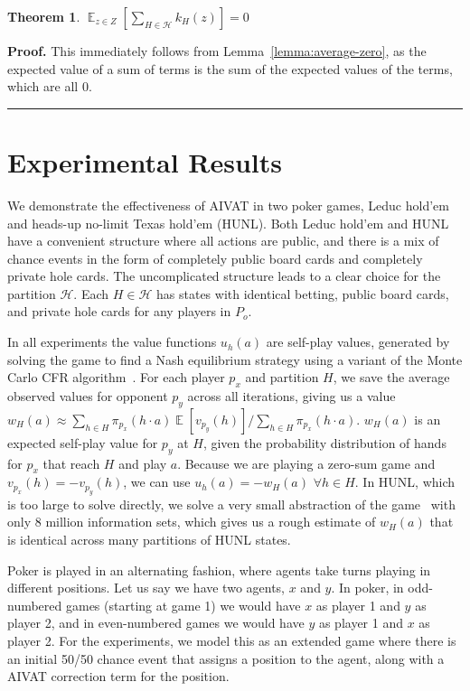 \documentclass[letterpaper]{article}
\newtheorem{theorem}{Theorem}
\newenvironment{proof}[1][Proof]{\textbf{#1.} }{\ \rule{0.5em}{0.5em}}
\def\VAT{AIVAT}
\def\leduc{Leduc hold'em}
\def\texas{Texas hold'em}
\begin{document}
\begin{theorem}
$\mathop{\mathbb{E}}_{z \in Z} [\sum_{H \in \mathcal{H}} k_H(z) ] = 0$
\end{theorem}
\begin{proof}
This immediately follows from Lemma~\ref{lemma:average-zero}, as the
expected value of a sum of terms is the sum of the expected values of
the terms, which are all $0$.
\end{proof}


\section{Experimental Results}
We demonstrate the effectiveness of \VAT{} in two poker games,
\leduc{} and heads-up no-limit \texas{} (HUNL). Both \leduc{} and
HUNL have a convenient structure where all actions are public, and
there is a mix of chance events in the form of completely public board
cards and completely private hole cards. The uncomplicated structure
leads to a clear choice for the partition $\mathcal{H}$. Each
$H \in \mathcal{H}$ has states with identical betting, public board
cards, and private hole cards for any players in $P_o$.

In all experiments the value functions $u_h(a)$ are self-play values,
generated by solving the game to find a Nash equilibrium strategy
using a variant of the Monte Carlo CFR
algorithm~\cite{09nips-mccfr}. For each player $p_x$ and partition
$H$, we save the average observed values for opponent $p_y$ across all
iterations, giving us a value $w_H(a) \approx \sum_{h \in
H} \pi_{p_x}(h \cdot a) \mathop{\mathbb{E}}[v_{p_y}(h)] / \sum_{h \in
H} \pi_{p_x}(h \cdot a)$. $w_H(a)$ is an expected self-play value for
$p_y$ at $H$, given the probability distribution of hands for $p_x$
that reach $H$ and play $a$. Because we are playing a zero-sum game
and $v_{p_x}(h)=-v_{p_y}(h)$, we can use $u_h(a) = -w_{H}(a)$ $\forall
h \in H$. In HUNL, which is too large to solve directly, we solve a
very small abstraction of the game~\cite{03ijcai-psopti,Ganzfried14}
with only 8 million information sets, which gives us a rough estimate
of $w_H(a)$ that is identical across many partitions of HUNL states.

Poker is played in an alternating fashion, where agents take turns
playing in different positions. Let us say we have two agents, $x$ and
$y$. In poker, in odd-numbered games (starting at game 1) we would
have $x$ as player 1 and $y$ as player 2, and in even-numbered games
we would have $y$ as player 1 and $x$ as player 2. For the
experiments, we model this as an extended game where there is an
initial 50/50 chance event that assigns a position to the agent, along
with a \VAT{} correction term for the position.
\end{document}

